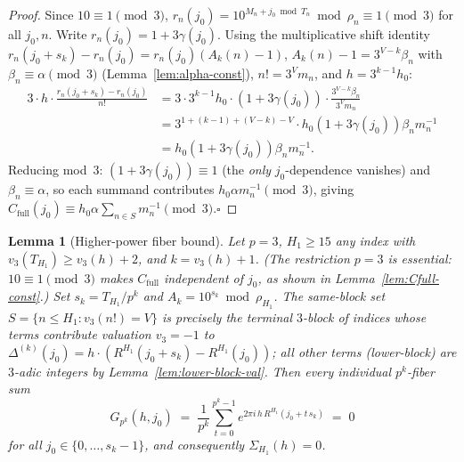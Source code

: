 \documentclass[
]{article}
\newtheorem{lemma}[theorem]{Lemma}
\begin{document}
\begin{proof}
Since $10\equiv 1\pmod 3$, $r_n(j_0)=10^{M_n+j_0\bmod T_n}\bmod\rho_n\equiv 1\pmod 3$
for all $j_0, n$.  Write $r_n(j_0)=1+3\gamma(j_0)$.
Using the multiplicative shift identity $r_n(j_0+s_k)-r_n(j_0)=r_n(j_0)(A_k(n)-1)$,
$A_k(n)-1=3^{V-k}\beta_n$ with $\beta_n\equiv\alpha\pmod 3$ (Lemma~\ref{lem:alpha-const}),
$n!=3^V m_n$, and $h=3^{k-1}h_0$:
\begin{align*}
3\cdot h\cdot\frac{r_n(j_0+s_k)-r_n(j_0)}{n!}
&=3\cdot 3^{k-1}h_0\cdot(1+3\gamma(j_0))\cdot\frac{3^{V-k}\beta_n}{3^Vm_n}\\
&=3^{1+(k-1)+(V-k)-V}\cdot h_0(1+3\gamma(j_0))\beta_n m_n^{-1}\\
&=h_0(1+3\gamma(j_0))\beta_n m_n^{-1}.
\end{align*}
Reducing mod~$3$: $(1+3\gamma(j_0))\equiv 1$ (the \emph{only} $j_0$-dependence vanishes)
and $\beta_n\equiv\alpha$, so each summand contributes $h_0\alpha m_n^{-1}\pmod 3$,
giving $C_{\mathrm{full}}(j_0)\equiv h_0\alpha\sum_{n\in S}m_n^{-1}\pmod 3$.\hfill$\square$
\end{proof}


\begin{lemma}[Higher-power fiber bound]\label{lem:higher-power-fiber}
Let $p=3$, $H_1\ge 15$ any index with $v_3(T_{H_1})\ge v_3(h)+2$,
and $k=v_3(h)+1$.
(The restriction $p=3$ is essential: $10\equiv 1\pmod{3}$ makes $C_{\mathrm{full}}$
independent of $j_0$, as shown in Lemma~\ref{lem:Cfull-const}.)
Set $s_k = T_{H_1}/p^k$ and $A_k = 10^{s_k}\bmod \rho_{H_1}$.
The same-block set $S=\{n\le H_1:v_3(n!)=V\}$ is precisely the terminal
$3$-block of indices whose terms contribute valuation $v_3=-1$ to
$\Delta^{(k)}(j_0)=h\cdot(R^{H_1}(j_0+s_k)-R^{H_1}(j_0))$;
all other terms (lower-block) are $3$-adic integers by Lemma~\ref{lem:lower-block-val}.
Then every individual $p^k$-fiber sum
\[
  G_{p^k}(h,j_0)
  \;=\;\frac{1}{p^k}\sum_{t=0}^{p^k-1} e^{2\pi i\,h\,R^{H_1}(j_0+t\,s_k)}
  \;=\;0
\]
for all $j_0\in\{0,\ldots,s_k-1\}$, and consequently $\Sigma_{H_1}(h)=0$.
\end{lemma}
\end{document}

